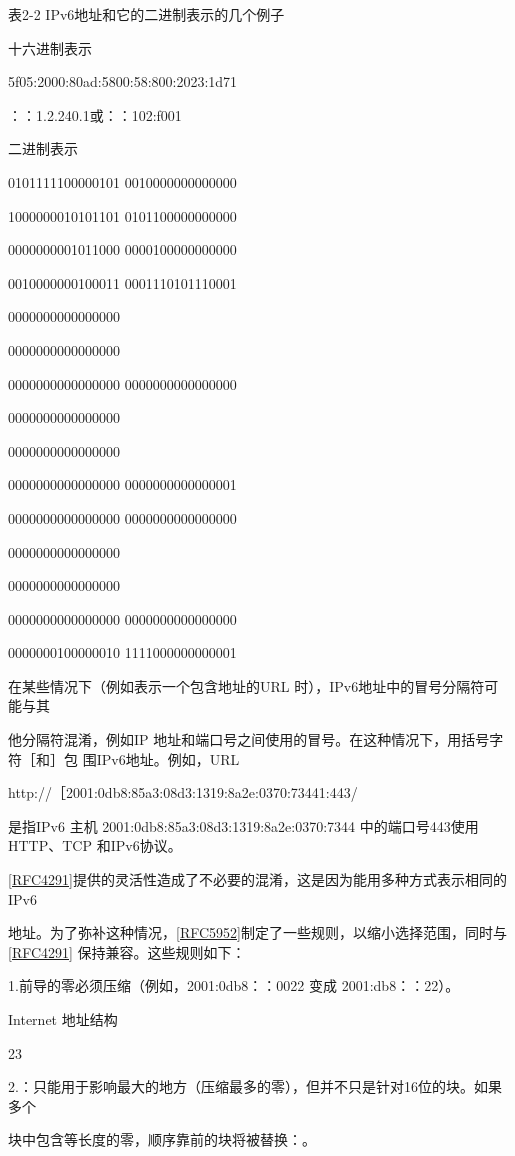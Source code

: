 表2-2 IPv6地址和它的二进制表示的几个例子

十六进制表示

5f05:2000:80ad:5800:58:800:2023:1d71

：：1.2.240.1或：：102:f001

二进制表示

0101111100000101 0010000000000000

1000000010101101 0101100000000000

0000000001011000 0000100000000000

0010000000100011 0001110101110001

0000000000000000

0000000000000000

0000000000000000 0000000000000000

0000000000000000

0000000000000000

0000000000000000 0000000000000001

0000000000000000 0000000000000000

0000000000000000

0000000000000000

0000000000000000 0000000000000000

0000000100000010 1111000000000001

在某些情况下（例如表示一个包含地址的URL 时），IPv6地址中的冒号分隔符可能与其

他分隔符混淆，例如IP 地址和端口号之间使用的冒号。在这种情况下，用括号字符［和］包
围IPv6地址。例如，URL

http://［2001:0db8:85a3:08d3:1319:8a2e:0370:73441:443/

是指IPv6 主机 2001:0db8:85a3:08d3:1319:8a2e:0370:7344 中的端口号443使用HTTP、TCP
和IPv6协议。

\href{https://www.rfc-editor.org/rfc/rfc4291}{[RFC4291]}提供的灵活性造成了不必要的混淆，这是因为能用多种方式表示相同的IPv6

地址。为了弥补这种情况，\href{https://www.rfc-editor.org/rfc/rfc5952}{[RFC5952]}制定了一些规则，以缩小选择范围，同时与\href{https://www.rfc-editor.org/rfc/rfc4291}{[RFC4291]}
保持兼容。这些规则如下：

1.前导的零必须压缩（例如，2001:0db8：：0022 变成 2001:db8：：22）。

Internet 地址结构

23

2.：只能用于影响最大的地方（压缩最多的零），但并不只是针对16位的块。如果多个

块中包含等长度的零，顺序靠前的块将被替换：。

